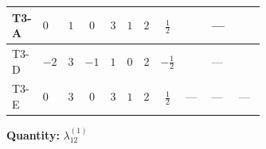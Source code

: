 \documentclass[8pt]{article}
\begin{document}
\begin{landscape}
\begin{longtable}{@{}llcccccc >{\raggedright\arraybackslash}p{0.21\linewidth} >{\raggedright\arraybackslash}p{0.21\linewidth} >{\raggedright\arraybackslash}p{0.21\linewidth}@{}}
\midrule
T3-A & $0$ & $1$ & $0$ & $3$ & $1$ & $2$ & $\frac{1}{2}$ & \scriptsize\adjustbox{max width=\linewidth}{$\begin{gathered} -12 {g_2}^2 {\lambda_{12}^{(1)}}\end{gathered}$} & --- & \scriptsize\adjustbox{max width=\linewidth}{$\begin{gathered} -6 {g_1}^2 {\lambda_{12}^{(1)}}\end{gathered}$} \\
\midrule
T3-D & $-2$ & $3$ & $-1$ & $1$ & $0$ & $2$ & $-\frac{1}{2}$ & \scriptsize\adjustbox{max width=\linewidth}{$\begin{gathered} -12 {g_2}^2 {\lambda_{12}^{(1)}}\end{gathered}$} & --- & \scriptsize\adjustbox{max width=\linewidth}{$\begin{gathered} -6 {g_1}^2 {\lambda_{12}^{(1)}}\end{gathered}$} \\
\midrule
T3-E & $0$ & $3$ & $0$ & $3$ & $1$ & $2$ & $\frac{1}{2}$ & --- & --- & --- \\
\midrule
\bottomrule
\end{longtable}
\clearpage
\noindent\textbf{Quantity: }$\lambda_{12}^{(1)}$\par\smallskip

\end{landscape}
\end{document}
